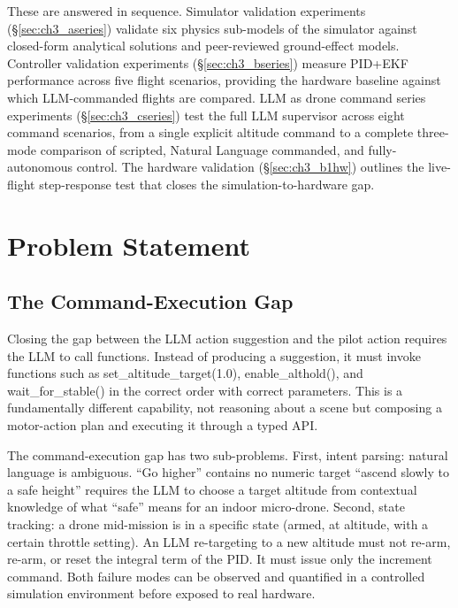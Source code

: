 These are answered in sequence. Simulator validation experiments (\S\ref{sec:ch3_aseries}) validate six physics sub-models of the simulator against closed-form analytical solutions and peer-reviewed ground-effect models. 
Controller validation experiments (\S\ref{sec:ch3_bseries}) measure PID+EKF performance across five flight scenarios, providing the hardware baseline against which LLM-commanded flights are compared. 
LLM as drone command series experiments (\S\ref{sec:ch3_cseries}) test the full LLM supervisor across eight command scenarios, from a single explicit altitude command to a complete three-mode comparison of scripted, Natural Language commanded, and fully-autonomous control. 
The hardware validation (\S\ref{sec:ch3_b1hw}) outlines the live-flight step-response test that closes the simulation-to-hardware gap.

\section{Problem Statement}
\label{sec:ch3_problem}

\subsection{The Command-Execution Gap}
\label{sec:ch3_problem_gap}

Closing the gap between the LLM action suggestion and the pilot action requires the LLM to call functions.
Instead of producing a suggestion, it must invoke functions such as set\_altitude\_target(1.0), enable\_althold(), and
wait\_for\_stable() in the correct order with correct parameters.
This is a fundamentally different capability, not reasoning about a scene but composing a motor-action plan and executing it through a typed API.

The command-execution gap has two sub-problems. 
First, intent parsing: natural language is ambiguous. ``Go higher'' contains no numeric target ``ascend slowly to a safe height'' requires the LLM to choose a target altitude from contextual knowledge of what ``safe'' means for an indoor micro-drone. 
Second, state tracking: a drone mid-mission is in a specific state (armed, at altitude, with a certain throttle setting). 
An LLM re-targeting to a new altitude must not re-arm, re-arm, or reset the integral term of the PID.
It must issue only the increment command. 
Both failure modes can be observed and quantified in a controlled simulation environment before exposed to real hardware.


